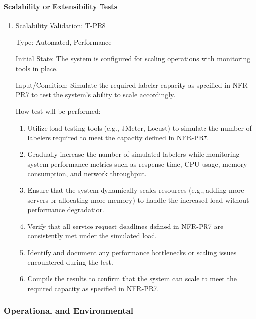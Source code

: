 \documentclass[12pt, titlepage]{article}
\begin{document}
\paragraph{Scalability or Extensibility Tests}
\begin{enumerate}

\item{Scalability Validation: T-PR8\\}

Type: Automated, Performance

Initial State: The system is configured for scaling operations with monitoring tools in place.

Input/Condition: Simulate the required labeler capacity as specified in NFR-PR7 to test the system's ability to scale accordingly.

How test will be performed:
\begin{enumerate}
    \item Utilize load testing tools (e.g., JMeter, Locust) to simulate the number of labelers required to meet the capacity defined in NFR-PR7.
    \item Gradually increase the number of simulated labelers while monitoring system performance metrics such as response time, CPU usage, memory consumption, and network throughput.
    \item Ensure that the system dynamically scales resources (e.g., adding more servers or allocating more memory) to handle the increased load without performance degradation.
    \item Verify that all service request deadlines defined in NFR-PR7 are consistently met under the simulated load.
    \item Identify and document any performance bottlenecks or scaling issues encountered during the test.
    \item Compile the results to confirm that the system can scale to meet the required capacity as specified in NFR-PR7.
\end{enumerate}

\end{enumerate}





\subsubsection{Operational and Environmental}
\end{document}
